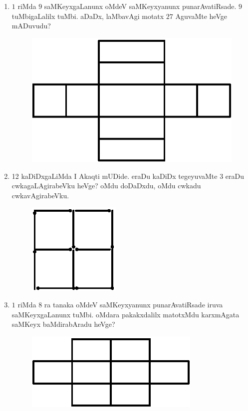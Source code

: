 \begin{enumerate}
\item $1$ riMda $9$ saMKeyxgaLanunx oMdeV saMKeyxyanunx punarAvatiRsade. $9$ tuMbigaLalilx tuMbi. aDaDx, laMbavAgi motatx $27$ AguvaMte heVge mADuvudu?
\begin{figure}[H]
\centering
\includegraphics{src/figures/exr10.eps}
\end{figure}

\item 12 kaDiDxgaLiMda I Akaqti mUDide. eraDu kaDiDx tegeyuvaMte $3$ eraDu cwkagaLAgirabeVku heVge? oMdu doDaDxdu, oMdu cwkadu cwkavAgirabeVku.
\begin{figure}[H]
\centering
\includegraphics{src/figures/exr11.eps}
\end{figure}

\item $1$ riMda $8$ ra tanaka oMdeV saMKeyxyanunx punarAvatiRsade iruva saMKeyxgaLanunx tuMbi. oMdara pakakxdalilx matotxMdu karxmAgata saMKeyx baMdirabAradu heVge?
\begin{figure}[H]
\centering
\includegraphics{src/figures/exr12.eps}
\end{figure}


\end{enumerate}
